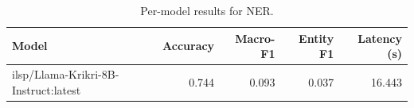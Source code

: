 \begin{table}[t]
\centering
\caption{Per-model results for NER.}
\label{tab:appendix-ner-analysis}
\begin{tabular}{lrrrr}
\toprule
Model & Accuracy & Macro-F1 & Entity F1 & Latency (s) \\
\midrule
ilsp/Llama-Krikri-8B-Instruct:latest & 0.744 & 0.093 & 0.037 & 16.443 \\
\bottomrule
\end{tabular}
\end{table}
